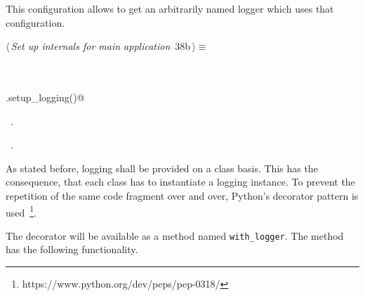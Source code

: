 \documentclass[
    a4paper,      %
    10pt,         %
    openright,    %
    notitlepage,  %
    parskip=half, %
]{scrreprt}       %
\theoremstyle{definition}                    %
\begin{document}
This configuration allows to get an arbitrarily named logger which uses that
configuration.

\begin{flushleft} \small
\begin{minipage}{\linewidth}\label{scrap47}\raggedright\small
{} $\langle\,${\itshape Set up internals for main application}\nobreak\ {\footnotesize {38b}}$\,\rangle\equiv$
\vspace{-1exm}
\begin{list}{}{} \item
\mbox{}\lstinline@@\\
\mbox{}\lstinline@@\\
\mbox{}\lstinline@self.setup_logging()@{\NWsep}
\end{list}
\vspace{-1.5ex}
\footnotesize
\begin{list}{}{\setlength{\itemsep}{-\parsep}\setlength{\itemindent}{-\leftmargin}}
\item \NWtxtMacroDefBy\ .
\item \NWtxtMacroRefIn\ .

\item{}
\end{list}
\end{minipage}\vspace{4ex}
\end{flushleft}
As stated before, logging shall be provided on a class basis. This has the
consequence, that each class has to instantiate a logging instance. To prevent
the repetition of the same code fragment over and over, Python's decorator
pattern is used~\footnote{https://www.python.org/dev/peps/pep-0318/}.

The decorator will be available as a method named \verb+with_logger+.
The method has the following functionality.
\end{document}
